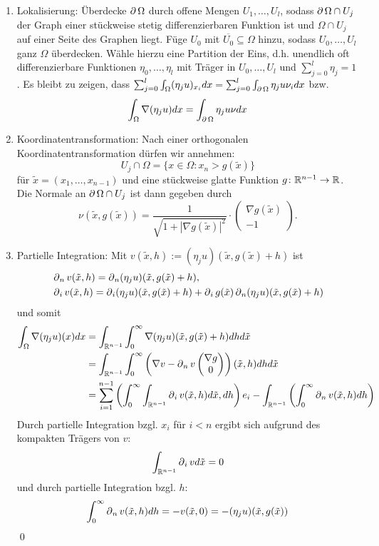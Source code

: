 	\begin{enumerate}
		\item Lokalisierung: Überdecke $\operatorname{\partial} \Omega$ durch offene Mengen $U_1,\dots,U_l$, sodass $\operatorname{\partial} \Omega \cap U_j$ der Graph einer stückweise stetig differenzierbaren Funktion ist und $\Omega \cap U_j$ auf einer Seite des Graphen liegt. Füge $U_0$ mit $\overline{U_0} \subseteq \Omega$ hinzu, sodass $U_0, \dots, U_l$ ganz $\Omega$ überdecken. Wähle hierzu eine Partition der Eins, d.h. unendlich oft differenzierbare Funktionen $\eta_0,\dots,\eta_l$ mit Träger in $U_0, \dots, U_l$ und $\sum_{j=0}^{l} \eta_j = 1$. Es bleibt zu zeigen, dass $\sum_{j=0}^l \int_{\Omega} (\eta_j u)_{x_i} dx = \sum_{j=0}^l \int_{\operatorname{\partial} \Omega} \eta_j u \nu_i dx$ bzw.
		\[ \int_{\Omega} \nabla(\eta_j u) dx = \int_{\operatorname{\partial} \Omega} \eta_j u\nu dx \]
		\item Koordinatentransformation: Nach einer orthogonalen Koordinatentransformation dürfen wir annehmen:
		\[ U_j \cap \Omega = \{ x \in \Omega : x_n > g(\tilde{x}) \} \]
		für $\tilde{x} = (x_1,\dots,x_{n-1})$ und eine stückweise glatte Funktion $g \colon \mathbb{R}^{n-1} \rightarrow \mathbb{R}$. Die Normale an $\operatorname{\partial} \Omega \cap U_j$ ist dann gegeben durch
		\[ \nu(\tilde{x},g(\tilde{x})) = \frac{1}{\sqrt{1+|\nabla g(\tilde{x})|^2}} \cdot \begin{pmatrix} \nabla g(\tilde{x}) \\ -1 \end{pmatrix}. \]
		\item Partielle Integration: Mit $v(\tilde{x},h) := (\eta_j u)(\tilde{x},g(\tilde{x})+h)$ ist
		\begin{align}
			&\operatorname{\partial}_n v(\tilde{x},h) = \operatorname{\partial}_n (\eta_j u)(\tilde{x},g(\tilde{x}) + h), \notag \\
			&\operatorname{\partial}_i v(\tilde{x},h) = \operatorname{\partial}_i (\eta_j u)(\tilde{x},g(\tilde{x}) + h) + \operatorname{\partial}_i g(\tilde{x}) \operatorname{\partial}_n(\eta_j u)(\tilde{x},g(\tilde{x}) + h) \notag
		\end{align}
		und somit
		\begin{equation}
		\begin{aligned}
			\int_\Omega \nabla (\eta_j u)(x) dx &= \int_{\mathbb{R}^{n-1}} \int_{0}^{\infty} \nabla(\eta_j u)(\tilde{x},g(\tilde{x}) + h) dh d\tilde{x} \\ \notag
			&= \int_{\mathbb{R}^{n-1}} \int_{0}^{\infty} \left(\nabla v - \operatorname{\partial}_n v \begin{pmatrix} \nabla g \\ 0 \end{pmatrix} \right) (\tilde{x},h) dh d\tilde{x} \\
			&= \sum\limits_{i=1}^{n-1} \left( \int_{0}^{\infty} \int_{\mathbb{R}^{n-1}} \operatorname{\partial}_i v(\tilde{x},h) d\tilde{x}, dh \right) e_i - \int_{\mathbb{R}^{n-1}} \left( \int_{0}^{\infty} \operatorname{\partial}_n v(\tilde{x},h) dh \right)
		\end{aligned}
		\end{equation}
		Durch partielle Integration bzgl. $x_i$ für $i < n$ ergibt sich aufgrund des kompakten Trägers von $v$:
		\[ \int_{\mathbb{R}^{n-1}} \operatorname{\partial}_i v d\tilde{x} = 0 \]
		und durch partielle Integration bzgl. $h$:
		\[ \int_{0}^{\infty} \operatorname{\partial}_n v(\tilde{x},h) dh = -v(\tilde{x},0) = -(\eta_j u)(\tilde{x},g(\tilde{x})) \] \qed
	\end{enumerate}
	
